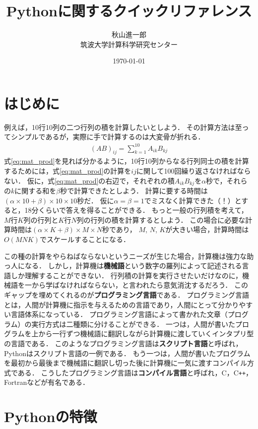 \documentclass[a4paper,12pt]{jsarticle}
\title{Pythonに関するクイックリファレンス}
\author{秋山進一郎\\筑波大学計算科学研究センター}
\date{\today}
\begin{document}
\maketitle
\tableofcontents

\section{はじめに}

例えば，10行10列の二つ行列の積を計算したいとしよう．
その計算方法は至ってシンプルであるが，実際に手で計算するのは大変骨が折れる．
\begin{align}
\label{eq:mat_prod}
    (AB)_{ij}
    =
    \sum_{k=1}^{10}A_{ik}B_{kj}
\end{align}
式\eqref{eq:mat_prod}を見れば分かるように，10行10列からなる行列同士の積を計算するためには，式\eqref{eq:mat_prod}の計算を$ij$に関して100回繰り返さなければならない．
仮に，式\eqref{eq:mat_prod}の右辺で，それぞれの積$A_{ik}B_{kj}$を$\alpha$秒で，それらの$k$に関する和を$\beta$秒で計算できたとしよう．
計算に要する時間は$(\alpha\times10+\beta)\times10\times10$秒だ．
仮に$\alpha=\beta=1$でミスなく計算できた（！）とすると，18分くらいで答えを得ることができる．
もっと一般の行列積を考えて，$M$行$K$列の行列と$K$行$N$列の行列の積を計算するとしよう．
この場合に必要な計算時間は$(\alpha\times K+\beta)\times M\times N$秒であり，
$M$, $N$, $K$が大きい場合，計算時間は$O(MNK)$でスケールすることになる．

この種の計算をやらねばならないというニーズが生じた場合，計算機は強力な助っ人になる．
しかし，計算機は{\bf 機械語}という数字の羅列によって記述される言語しか理解することができない．
行列積の計算を実行させたいだけなのに，機械語を一から学ばなければならない，と言われたら意気消沈するだろう．
このギャップを埋めてくれるのが{\bf プログラミング言語}である．
プログラミング言語とは，人間が計算機に指示を与えるための言語であり，人間にとって分かりやすい言語体系になっている．
プログラミング言語によって書かれた文章（プログラム）の実行方式は二種類に分けることができる．
一つは，人間が書いたプログラムを上から一行ずつ機械語に翻訳しながら計算機に渡していくインタプリ型の言語である．
このようなプログラミング言語は{\bf スクリプト言語}と呼ばれ，Pythonはスクリプト言語の一例である．
もう一つは，人間が書いたプログラムを最初から最後まで機械語に翻訳し切った後に計算機に一気に渡すコンパイル方式である．
こうしたプログラミング言語は{\bf コンパイル言語}と呼ばれ，C，C\texttt{++}，Fortranなどが有名である．

\section{Pythonの特徴}
\end{document}
